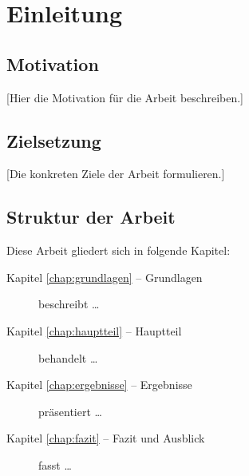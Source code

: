 \chapter{Einleitung}

\section{Motivation}
[Hier die Motivation für die Arbeit beschreiben.]

\section{Zielsetzung}
[Die konkreten Ziele der Arbeit formulieren.]

\section{Struktur der Arbeit}
Diese Arbeit gliedert sich in folgende Kapitel:

\begin{description}
    \item[Kapitel \ref{chap:grundlagen} – Grundlagen] beschreibt \ldots
    \item[Kapitel \ref{chap:hauptteil} – Hauptteil] behandelt \ldots
    \item[Kapitel \ref{chap:ergebnisse} – Ergebnisse] präsentiert \ldots
    \item[Kapitel \ref{chap:fazit} – Fazit und Ausblick] fasst \ldots
\end{description}
